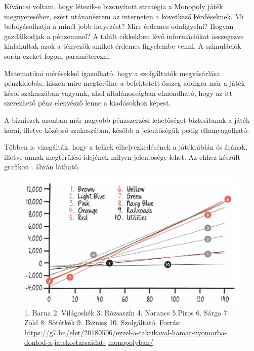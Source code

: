 
Kíváncsi voltam, hogy létezik-e bizonyított stratégia a Monopoly játék megnyereséhez, ezért utánanéztem az interneten a következő kérdéseknek. Mi befolyásolhatja a minél jobb helyezést? Mire érdemes odafigyelni? Hogyan gazdálkodjak a pénzemmel? A talált cikkekben lévő információkat összegezve kialakultak azok a tényezők amiket érdemes figyelembe venni. A szimulációk során ezeket fogom paraméterezni.


Matematikai mérésekkel igazolható, hogy a szolgáltatók megvásárlása pénzkidobás, hiszen mire megtérülne a befektetett összeg addigra már a játék késői szakaszában vagyunk, ahol általánosságban elmondható, hogy az itt szerezhető pénz elenyésző lenne a kiadásokhoz képest.

A bizniszek azonban már nagyobb pénzszerzési lehetőséget biztosítanak a játék korai, illetve középső szakaszában, később a jelentőségük pedig elhanyagolható.


Többen is vizsgálták, hogy a telkek elhelyezkedésének a játéktáblán és árának, illetve annak megtérülési idejének milyen jelentősége lehet. Az ehhez készült grafikon . ábrán látható.

\begin{figure}[h!]
\centering
\includegraphics[scale=0.4]{images/monop1.jpg}
\caption{1. Barna 2. Világoskék 3. Rózsaszín 4. Narancs 5.Piros 6. Sárga 7. Zöld 8. Sötétkék 9. Biznisz 10. Szolgáltató.
Forrás: \url{https://g7.hu/elet/20180506/ezzel-a-taktikaval-hamar-nyomorba-dontod-a-jatekostarsaidat-} \url{monopolyban/}}
\label{fig:grafikon}
\end{figure}

